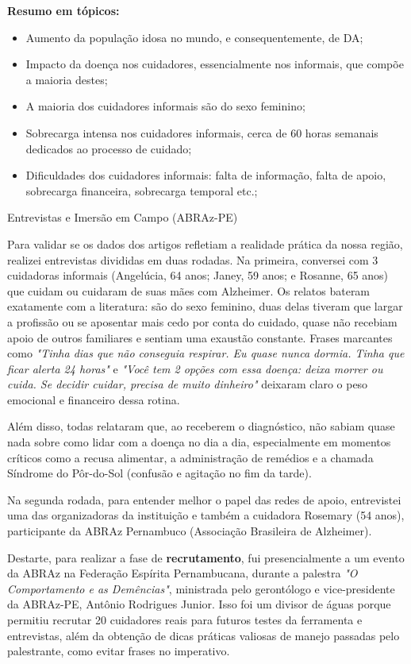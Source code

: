 \documentclass[11pt,a4paper]{article}
\newcommand{\subtituloSecao}[1]{%
  \par\addvspace{10pt}%
  {\noindent\fontsize{16pt}{20pt}\selectfont\normalfont\color{headingBlue}#1\par}%
  \vspace{3pt}%
}
\begin{document}
\noindent\textbf{Resumo em tópicos:}

\begin{itemize}[leftmargin=1.8cm, itemindent=0pt, label=\textbullet, topsep=4pt, itemsep=2pt]
  \item Aumento da população idosa no mundo, e consequentemente, de DA;
  \item Impacto da doença nos cuidadores, essencialmente nos informais, que compõe a maioria destes;
  \item A maioria dos cuidadores informais são do sexo feminino;
  \item Sobrecarga intensa nos cuidadores informais, cerca de 60 horas semanais dedicados ao processo de cuidado;
  \item Dificuldades dos cuidadores informais: falta de informação, falta de apoio, sobrecarga financeira, sobrecarga temporal etc.;
\end{itemize}

\subtituloSecao{Entrevistas e Imersão em Campo (ABRAz-PE)}

\noindent Para validar se os dados dos artigos refletiam a realidade prática da nossa região, realizei entrevistas divididas em duas rodadas. Na primeira, conversei com 3 cuidadoras informais (Angelúcia, 64 anos; Janey, 59 anos; e Rosanne, 65 anos) que cuidam ou cuidaram de suas mães com Alzheimer. Os relatos bateram exatamente com a literatura: são do sexo feminino, duas delas tiveram que largar a profissão ou se aposentar mais cedo por conta do cuidado, quase não recebiam apoio de outros familiares e sentiam uma exaustão constante. Frases marcantes como \textit{"Tinha dias que não conseguia respirar. Eu quase nunca dormia. Tinha que ficar alerta 24 horas"} e \textit{"Você tem 2 opções com essa doença: deixa morrer ou cuida. Se decidir cuidar, precisa de muito dinheiro"} deixaram claro o peso emocional e financeiro dessa rotina.

Além disso, todas relataram que, ao receberem o diagnóstico, não sabiam quase nada sobre como lidar com a doença no dia a dia, especialmente em momentos críticos como a recusa alimentar, a administração de remédios e a chamada Síndrome do Pôr-do-Sol (confusão e agitação no fim da tarde).

Na segunda rodada, para entender melhor o papel das redes de apoio, entrevistei uma das organizadoras da instituição e também a cuidadora Rosemary (54 anos), participante da ABRAz Pernambuco (Associação Brasileira de Alzheimer).

Destarte, para realizar a fase de \textbf{recrutamento}, fui presencialmente a um evento da ABRAz na Federação Espírita Pernambucana, durante a palestra \textit{"O Comportamento e as Demências"}, ministrada pelo gerontólogo e vice-presidente da ABRAz-PE, Antônio Rodrigues Junior. Isso foi um divisor de águas porque permitiu recrutar 20 cuidadores reais para futuros testes da ferramenta e entrevistas, além da obtenção de dicas práticas valiosas de manejo passadas pelo palestrante, como evitar frases no imperativo.
\end{document}
